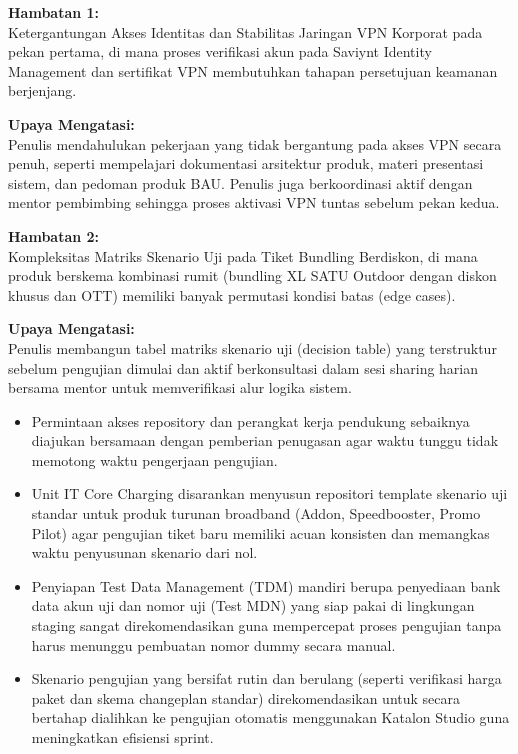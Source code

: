 \documentclass[12pt,a4paper]{article}
\begin{document}
\vspace{0.3cm}
\vspace{0.1cm}
\noindent\textbf{Hambatan 1:}\\
Ketergantungan Akses Identitas dan Stabilitas Jaringan VPN Korporat pada pekan pertama, di mana proses verifikasi akun pada Saviynt Identity Management dan sertifikat VPN membutuhkan tahapan persetujuan keamanan berjenjang.\par
\vspace{0.1cm}
\noindent\textbf{Upaya Mengatasi:}\\
Penulis mendahulukan pekerjaan yang tidak bergantung pada akses VPN secara penuh, seperti mempelajari dokumentasi arsitektur produk, materi presentasi sistem, dan pedoman produk BAU. Penulis juga berkoordinasi aktif dengan mentor pembimbing sehingga proses aktivasi VPN tuntas sebelum pekan kedua.

\clearpage
\noindent\textbf{Hambatan 2:}\\
Kompleksitas Matriks Skenario Uji pada Tiket Bundling Berdiskon, di mana produk berskema kombinasi rumit (bundling XL SATU Outdoor dengan diskon khusus dan OTT) memiliki banyak permutasi kondisi batas (edge cases).\par
\vspace{0.1cm}
\noindent\textbf{Upaya Mengatasi:}\\
Penulis membangun tabel matriks skenario uji (decision table) yang terstruktur sebelum pengujian dimulai dan aktif berkonsultasi dalam sesi sharing harian bersama mentor untuk memverifikasi alur logika sistem.

\vspace{0.4cm}
\vspace{0.1cm}
\begin{itemize}[label=\textbullet,leftmargin=1.5em,itemsep=2pt,topsep=1pt]
    \item Permintaan akses repository dan perangkat kerja pendukung sebaiknya diajukan bersamaan dengan pemberian penugasan agar waktu tunggu tidak memotong waktu pengerjaan pengujian.
    \item Unit IT Core Charging disarankan menyusun repositori template skenario uji standar untuk produk turunan broadband (Addon, Speedbooster, Promo Pilot) agar pengujian tiket baru memiliki acuan konsisten dan memangkas waktu penyusunan skenario dari nol.
    \item Penyiapan Test Data Management (TDM) mandiri berupa penyediaan bank data akun uji dan nomor uji (Test MDN) yang siap pakai di lingkungan staging sangat direkomendasikan guna mempercepat proses pengujian tanpa harus menunggu pembuatan nomor dummy secara manual.
    \item Skenario pengujian yang bersifat rutin dan berulang (seperti verifikasi harga paket dan skema changeplan standar) direkomendasikan untuk secara bertahap dialihkan ke pengujian otomatis menggunakan Katalon Studio guna meningkatkan efisiensi sprint.
\end{itemize}
\end{document}

